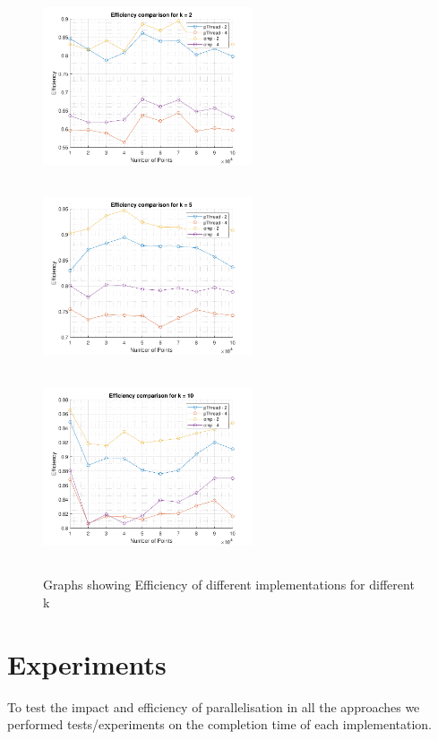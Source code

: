 \documentclass[a4paper, 11pt, margin=1in]{article}
\begin{document}
\begin{figure}[H]
    \centering
    \includegraphics[width=6.2cm,height=5.5cm]{ek2}
    \includegraphics[width=6.2cm,height=5.5cm]{ek5}
    \includegraphics[width=6.2cm,height=5.5cm]{ek10}
    \caption{Graphs showing Efficiency of different implementations for different k}
    \label{fig:efficiency}
\end{figure}

\section{Experiments}

To test the impact and efficiency of parallelisation in all the approaches we performed tests/experiments on the completion time of each implementation.
\end{document}

